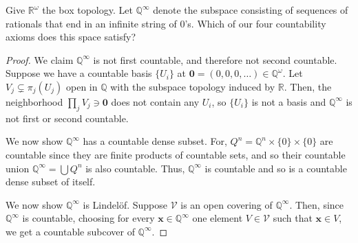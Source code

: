 \documentclass[12pt]{article}
\theoremstyle{remark}
\begin{document}
\setcounter{subsubsection}{16}
\begin{problem}
  Give $\mathbb{R}^\omega$ the box topology. Let $\mathbb{Q}^\infty$ denote the subspace consisting of sequences of rationals that end in an infinite string of $0$'s. Which of our four countability axioms does this space satisfy?
\end{problem}
\begin{proof}
  We claim $\mathbb{Q}^\infty$ is not first countable, and therefore not second
  countable. Suppose we have a countable basis $\{U_i\}$ at $\mathbf{0} =
  (0,0,0,\ldots) \in \mathbb{Q}^\omega$. Let $V_j \subsetneq \pi_j(U_j)$ open in
  $\mathbb{Q}$ with the subspace topology induced by $\mathbb{R}$.
  Then, the neighborhood $\prod_j V_j \ni \mathbf{0}$ does
  not contain any $U_i$, so $\{U_i\}$ is not a basis and
  $\mathbb{Q}^\infty$ is not first or second countable.
  \par We now show $\mathbb{Q}^\infty$ has a countable dense subset. For, $Q^n = \mathbb{Q}^n \times \{0\} \times \{0\}$ are countable since they are finite products of countable sets, and so their countable union $\mathbb{Q}^\infty = \bigcup Q^n$ is also countable. Thus, $\mathbb{Q}^\infty$ is countable and so is a countable dense subset of itself.
  \par We now show $\mathbb{Q}^\infty$ is Lindel\"of. Suppose $\mathcal{V}$ is an open covering of $\mathbb{Q}^\infty$. Then, since $\mathbb{Q}^\infty$ is countable, choosing for every $\mathbf{x} \in \mathbb{Q}^\infty$ one element $V \in \mathcal{V}$ such that $\mathbf{x} \in V$, we get a countable subcover of $\mathbb{Q}^\infty$.
\end{proof}
\end{document}
